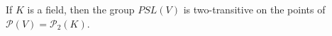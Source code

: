 If $K$ is a field, then the group $PSL(V)$ is two-transitive on the points of $\mathcal{P}(V) = \mathcal{P}_2(K)$.
